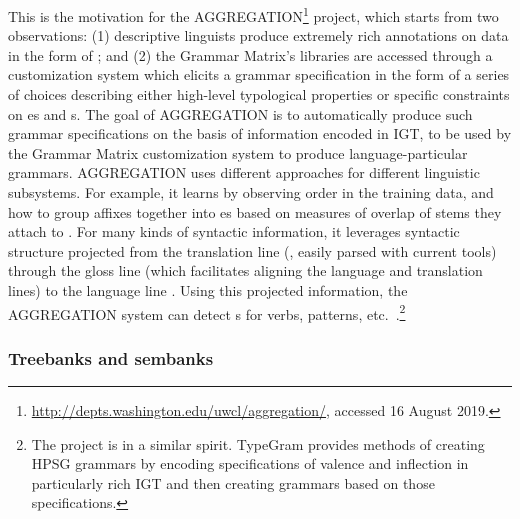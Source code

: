 \documentclass[output=paper
	        ,collection
	        ,collectionchapter
 	        ,biblatex
                ,babelshorthands
                ,newtxmath
                ,draftmode
                ,colorlinks, citecolor=brown
]{langscibook}
\begin{document}
This is the motivation for the AGGREGATION\footnote{\url{http://depts.washington.edu/uwcl/aggregation/}, accessed 16 August 2019.}
project, which starts from two observations: (1) descriptive linguists
produce extremely rich annotations on data in the form of ; and (2) the Grammar Matrix's libraries are
accessed through a customization system which elicits a grammar
specification in the form of a series of choices describing either
high-level typological properties or specific constraints on es and s.  The goal of AGGREGATION is to
automatically produce such grammar specifications on the basis of
information encoded in IGT, to be used by the Grammar Matrix
customization system to produce language-particular
grammars. AGGREGATION uses different approaches for different
linguistic subsystems. For example, it learns  by
observing  order in the training data, and how to group
affixes together into es based on measures of overlap of
stems they attach to \citep{Wax:14,Zamaraeva:17}. For many kinds of
syntactic information, it leverages syntactic structure projected from
the translation line (, easily parsed with current tools)
through the gloss line (which facilitates aligning the language and
translation lines) to the language line
\citep{Xia:Lew:07,Georgi:16}. Using this projected information, the
AGGREGATION system can detect s for verbs, 
patterns, etc.\ \citep{Ben:Goo:Cro:Xia:13,Zam:How:Ben:19}.\footnote{The  project \citep{Hel:Bee:14} is in a similar spirit. TypeGram provides methods of creating HPSG grammars by encoding specifications of valence and inflection in particularly rich IGT and then creating grammars based on those specifications.}


\subsubsection{Treebanks and sembanks}
\label{cl:lang-doc:treebanks}

\end{document}
